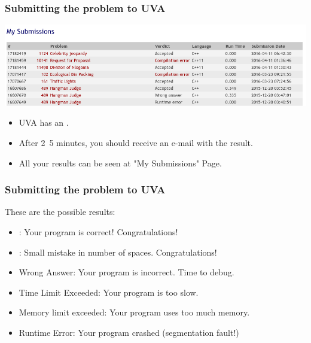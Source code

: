 \documentclass{beamer}
\begin{document}
\begin{frame}
  \frametitle{Submitting the problem to UVA}

    \begin{center}
      \includegraphics[width=1.1\textwidth]{../img/submissionpage}
    \end{center}

    \begin{itemize}
      \item UVA has an .
      \item After 2~5 minutes, you should receive an e-mail with the result.
      \item All your results can be seen at "My Submissions" Page.
    \end{itemize}
\end{frame}

\begin{frame}
  \frametitle{Submitting the problem to UVA}

  These are the possible results:

  \bigskip

  \begin{itemize}
  \item {}: Your program is correct!
    Congratulations!
  \item {}: Small mistake in number of spaces. Congratulations!

    \bigskip

  \item \alert{Wrong Answer}: Your program is incorrect. Time to debug.

    \bigskip

  \item \alert{Time Limit Exceeded}: Your program is too slow.

  \item \alert{Memory limit exceeded}: Your program uses too much memory.

    \bigskip
  \item \alert{Runtime Error}: Your program crashed (segmentation fault!)

    \bigskip
  \end{itemize}

\end{frame}
\end{document}
